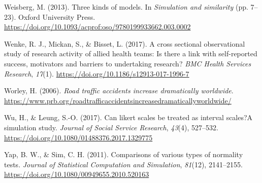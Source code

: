 \documentclass[
]{book}
\begin{document}
\leavevmode\hypertarget{ref-Weisberg2013}{}%
Weisberg, M. (2013). Three kinds of models. In \emph{Simulation and
similarity} (pp. 7--23). Oxford University Press.
\url{https://doi.org/10.1093/acprof:oso/9780199933662.003.0002}

\leavevmode\hypertarget{ref-Wenke2017}{}%
Wenke, R. J., Mickan, S., \& Bisset, L. (2017). A cross sectional
observational study of research activity of allied health teams: Is
there a link with self-reported success, motivators and barriers to
undertaking research? \emph{BMC Health Services Research}, \emph{17}(1).
\url{https://doi.org/10.1186/s12913-017-1996-7}

\leavevmode\hypertarget{ref-PRB2006}{}%
Worley, H. (2006). \emph{Road traffic accidents increase dramatically
worldwide}.
\url{https://www.prb.org/roadtrafficaccidentsincreasedramaticallyworldwide/}

\leavevmode\hypertarget{ref-Wu2017}{}%
Wu, H., \& Leung, S.-O. (2017). Can likert scales be treated as interval
scales?A simulation study. \emph{Journal of Social Service Research},
\emph{43}(4), 527--532.
\url{https://doi.org/10.1080/01488376.2017.1329775}

\leavevmode\hypertarget{ref-Yap2011}{}%
Yap, B. W., \& Sim, C. H. (2011). Comparisons of various types of
normality tests. \emph{Journal of Statistical Computation and
Simulation}, \emph{81}(12), 2141--2155.
\url{https://doi.org/10.1080/00949655.2010.520163}

\backmatter
\end{document}
